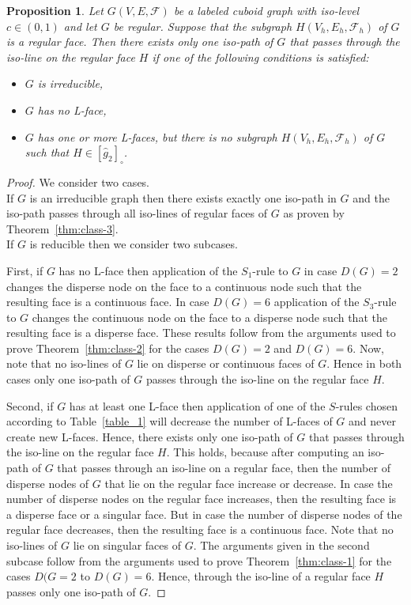 \documentclass[a4paper,11pt]{article}
\newtheorem{proposition}[theorem]{Proposition}
\begin{document}
\begin{proposition}
Let $G(V,E,\mathcal{F})$ be a labeled cuboid graph with iso-level $c\in (0,1)$ and let $G$ be regular.
Suppose that the subgraph $H(V_h,E_h,\mathcal{F}_h)$ of $G$ is a regular face. Then there exists only one
iso-path of $G$ that passes through the iso-line on the regular face $H$ if one of the following
conditions is satisfied:
\begin{itemize}
\item[(a)] $G$ is irreducible,
\item[(b)] $G$ has no L-face,
\item[(c)] $G$ has one or more L-faces, but there is no subgraph $H(V_h,E_h,\mathcal{F}_h)$ of
$G$ such that $H\in [\hat{g}_2]_{\circ}$.
\end{itemize}
\label{prop:class-7}
\end{proposition}
\begin{proof} We consider two cases.\\

If $G$ is an irreducible graph then there exists exactly one iso-path in $G$ and the
iso-path passes through all iso-lines of regular faces of $G$ as proven by Theorem~\ref{thm:class-3}. \\

If $G$ is reducible then we consider two subcases.

First, if $G$ has no L-face then application of the $S_1$-rule to $G$ in case $D(G)=2$ changes the disperse
node on the face to a continuous node such that the resulting face is a continuous face. In case $D(G)=6$
application of the $S_3$-rule to $G$ changes the continuous node on the face to a disperse node such that
the resulting face is a disperse face. These results follow from the arguments used to prove
Theorem~\ref{thm:class-2} for the cases $D(G)=2$ and $D(G)=6$. Now, note that no iso-lines of $G$ lie on
disperse or continuous faces of $G$. Hence in both cases only one iso-path of $G$ passes through the iso-line
on the regular face $H$.

Second, if $G$ has at least one L-face then application of one of the $S$-rules chosen according to
Table~\ref{table_1} will decrease the number of L-faces of $G$ and never create new L-faces. Hence, there
exists only one iso-path of $G$ that passes through the iso-line on the regular face $H$. This holds,
because after computing an iso-path of $G$ that passes through an iso-line on a regular face, then the
number of disperse nodes of $G$ that lie on the regular face increase or decrease. In case the number of
disperse nodes on the regular face increases, then the resulting face is a disperse face or a singular face.
But in case the number of disperse nodes of the regular face decreases, then the resulting face is a
continuous face. Note that no iso-lines of $G$ lie on singular faces of $G$. The arguments given in the
second subcase follow from the arguments used to prove Theorem~\ref{thm:class-1} for the cases $D(G=2$
to $D(G)=6$. Hence, through the iso-line of a regular face $H$ passes only one iso-path of $G$.
\end{proof}
\end{document}
